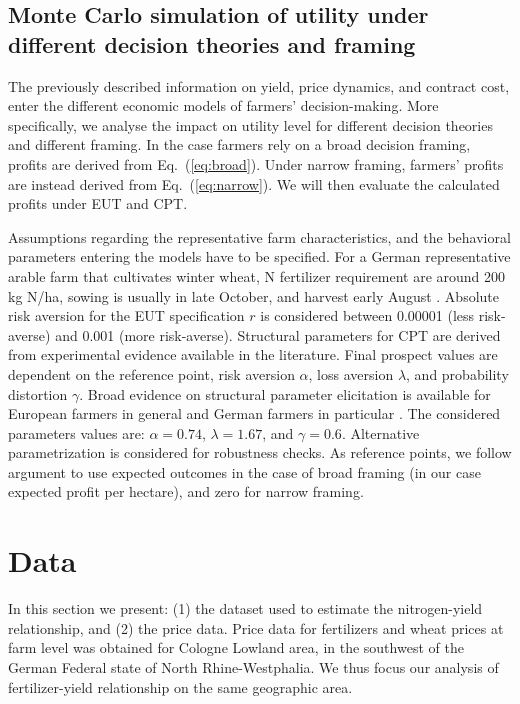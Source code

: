 \documentclass[12pt,a4paper]{article}
\begin{document}
\subsection{Monte Carlo simulation of utility under different decision theories and framing}

The previously described information on yield, price dynamics, and contract cost, enter the different economic models of farmers' decision-making. More specifically, we analyse the impact on utility level for different decision theories and different framing. In the case farmers rely on a broad decision framing, profits are derived from Eq.~(\ref{eq:broad}). Under narrow framing, farmers' profits are instead derived from Eq.~(\ref{eq:narrow}). We will then evaluate the calculated profits under EUT and CPT.

Assumptions regarding the representative farm characteristics, and the behavioral parameters entering the models have to be specified. For a German representative arable farm that cultivates winter wheat, N fertilizer requirement are around 200 kg N/ha, sowing is usually in late October, and harvest early August \citep{HernandezOchoa2023}. Absolute risk aversion for the EUT specification $r$ is considered between 0.00001 (less risk-averse) and 0.001 (more risk-averse). Structural parameters for CPT are derived from experimental evidence available in the literature. Final prospect values are dependent on the reference point, risk aversion $\alpha$, loss aversion $\lambda$, and probability distortion $\gamma$. Broad evidence on structural parameter elicitation is available for European farmers in general and German farmers in particular \citep{Bougherara2017, Finger2024, Rommel2023}. The considered parameters values are: $\alpha = 0.74$, $\lambda = 1.67$, and $\gamma = 0.6$. Alternative parametrization is considered for robustness checks. As reference points, we follow \citet{KoszegiRabin2007} argument to use expected outcomes in the case of broad framing (in our case expected profit per hectare), and zero for narrow framing.

\section{Data}
\label{sec:data}

In this section we present: (1) the dataset used to estimate the nitrogen-yield relationship, and (2) the price data. Price data for fertilizers and wheat prices at farm level was obtained for Cologne Lowland area, in the southwest of the German Federal state of North Rhine-Westphalia. We thus focus our analysis of fertilizer-yield relationship on the same geographic area.
\end{document}
